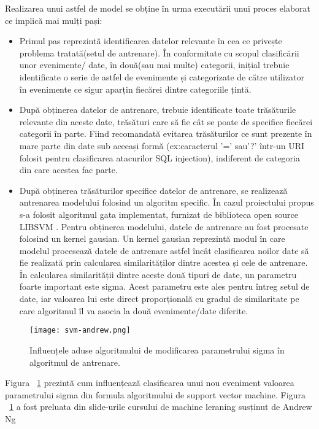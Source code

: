 Realizarea unui astfel de model se obține în urma executării unui proces elaborat ce implică mai mulți pași: 
\begin{itemize}
	\item  Primul pas reprezintă identificarea datelor relevante în cea ce privește problema tratată(setul de antrenare). În conformitate cu scopul clasificării unor evenimente/ date, în două(sau mai multe) categorii, inițial trebuie identificate o serie de astfel de evenimente și categorizate de către utilizator în evenimente ce sigur aparțin fiecărei dintre categoriile țintă. 
	\item  După  obținerea datelor de antrenare, trebuie identificate toate trăsăturile relevante din aceste date, trăsături care să fie cât se poate de specifice fiecărei categorii în parte. Fiind recomandată evitarea trăsăturilor ce sunt prezente în mare parte din date sub aceeași formă (ex:caracterul '=' sau'?' într-un URI folosit pentru clasificarea atacurilor SQL injection), indiferent de categoria din care acestea fac parte. 
	\item  După obținerea trăsăturilor specifice datelor de antrenare, se realizează antrenarea modelului folosind un algoritm specific. În cazul proiectului propus s-a folosit algoritmul gata implementat, furnizat de biblioteca open source LIBSVM  \cite{libsvm}.  Pentru obținerea modelului, datele de antrenare au fost procesate folosind un kernel gausian. Un kernel gausian reprezintă modul în care modelul procesează datele de antrenare astfel încât clasificarea noilor date să fie realizată prin calcularea similarităților dintre acestea și cele de antrenare. În calcularea similarității dintre aceste două tipuri de date, un parametru foarte important este sigma. Acest parametru este ales pentru întreg setul de date, iar valoarea lui este direct proporțională cu gradul de similaritate pe care algoritmul îl va asocia la două evenimente/date diferite. 
\end{itemize}



\begin{figure}[h]
	\centering
	\texttt{[image: svm-andrew.png]}
	\caption{Influențele aduse algoritmului de modificarea parametrului sigma în algoritmul de antrenare.}
	\label{fig:sigma-svm}
\end{figure} 


Figura ~\ref{fig:sigma-svm} prezintă cum influențează clasificarea unui nou eveniment valoarea parametrului sigma din formula algoritmului de support vector machine.  Figura ~\ref{fig:sigma-svm} a fost preluata din slide-urile cursului de machine leraning susținut de Andrew Ng \cite{andrew_ng} \\


